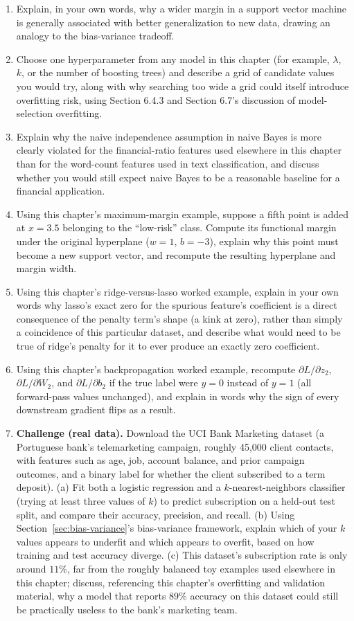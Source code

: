 \documentclass[../ai_in_finance]{subfiles}
\begin{document}
\begin{enumerate}
    \item Explain, in your own words, why a wider margin in a support vector machine is generally associated with better generalization to new data, drawing an analogy to the bias-variance tradeoff.
    \item Choose one hyperparameter from any model in this chapter (for example, $\lambda$, $k$, or the number of boosting trees) and describe a grid of candidate values you would try, along with why searching too wide a grid could itself introduce overfitting risk, using Section 6.4.3 and Section 6.7's discussion of model-selection overfitting.
    \item Explain why the naive independence assumption in naive Bayes is more clearly violated for the financial-ratio features used elsewhere in this chapter than for the word-count features used in text classification, and discuss whether you would still expect naive Bayes to be a reasonable baseline for a financial application.
    \item Using this chapter's maximum-margin example, suppose a fifth point is added at $x=3.5$ belonging to the ``low-risk'' class. Compute its functional margin under the original hyperplane ($w=1$, $b=-3$), explain why this point must become a new support vector, and recompute the resulting hyperplane and margin width.
    \item Using this chapter's ridge-versus-lasso worked example, explain in your own words why lasso's exact zero for the spurious feature's coefficient is a direct consequence of the penalty term's shape (a kink at zero), rather than simply a coincidence of this particular dataset, and describe what would need to be true of ridge's penalty for it to ever produce an exactly zero coefficient.
    \item Using this chapter's backpropagation worked example, recompute $\partial L/\partial z_2$, $\partial L/\partial W_2$, and $\partial L/\partial b_2$ if the true label were $y=0$ instead of $y=1$ (all forward-pass values unchanged), and explain in words why the sign of every downstream gradient flips as a result.
    \item \textbf{Challenge (real data).} Download the UCI Bank Marketing dataset (a Portuguese bank's telemarketing campaign, roughly 45,000 client contacts, with features such as age, job, account balance, and prior campaign outcomes, and a binary label for whether the client subscribed to a term deposit). (a) Fit both a logistic regression and a $k$-nearest-neighbors classifier (trying at least three values of $k$) to predict subscription on a held-out test split, and compare their accuracy, precision, and recall. (b) Using Section~\ref{sec:bias-variance}'s bias-variance framework, explain which of your $k$ values appears to underfit and which appears to overfit, based on how training and test accuracy diverge. (c) This dataset's subscription rate is only around $11\%$, far from the roughly balanced toy examples used elsewhere in this chapter; discuss, referencing this chapter's overfitting and validation material, why a model that reports $89\%$ accuracy on this dataset could still be practically useless to the bank's marketing team.
\end{enumerate}
\end{document}

